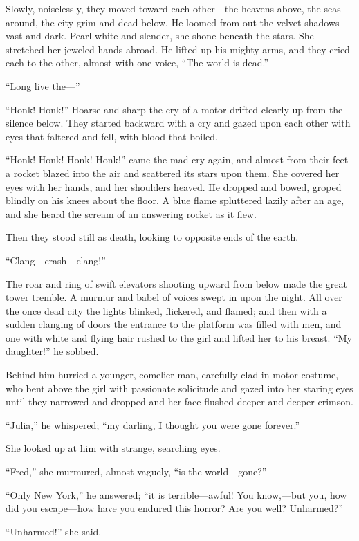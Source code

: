 Slowly, noiselessly, they moved toward each other---the heavens
above, the seas around, the city grim and dead below. He loomed
from out the velvet shadows vast and dark. Pearl-white and
slender, she shone beneath the stars. She stretched her jeweled
hands abroad. He lifted up his mighty arms, and they cried each
to the other, almost with one voice, ``The world is dead.''

``Long live the---''

``Honk! Honk!'' Hoarse and sharp the cry of a motor drifted
clearly up from the silence below. They started backward with a
cry and gazed upon each other with eyes that faltered and fell,
with blood that boiled.

``Honk! Honk! Honk! Honk!'' came the mad cry again, and almost
from their feet a rocket blazed into the air and scattered its
stars upon them. She covered her eyes with her hands, and her
shoulders heaved. He dropped and bowed, groped blindly on his
knees about the floor. A blue flame spluttered lazily after an
age, and she heard the scream of an answering rocket as it flew.

Then they stood still as death, looking to opposite ends of the
earth.

``Clang---crash---clang!''

The roar and ring of swift elevators shooting upward from below
made the great tower tremble. A murmur and babel of voices swept
in upon the night. All over the once dead city the lights
blinked, flickered, and flamed; and then with a sudden clanging
of doors the entrance to the platform was filled with men, and
one with white and flying hair rushed to the girl and lifted her
to his breast. ``My daughter!'' he sobbed.

Behind him hurried a younger, comelier man, carefully clad in
motor costume, who bent above the girl with passionate
solicitude and gazed into her staring eyes until they narrowed
and dropped and her face flushed deeper and deeper crimson.

``Julia,'' he whispered; ``my darling, I thought you were gone
forever.''

She looked up at him with strange, searching eyes.

``Fred,'' she murmured, almost vaguely, ``is the world---gone?''

``Only New York,'' he answered; ``it is terrible---awful! You
know,---but you, how did you escape---how have you endured this
horror? Are you well? Unharmed?''

``Unharmed!'' she said.

